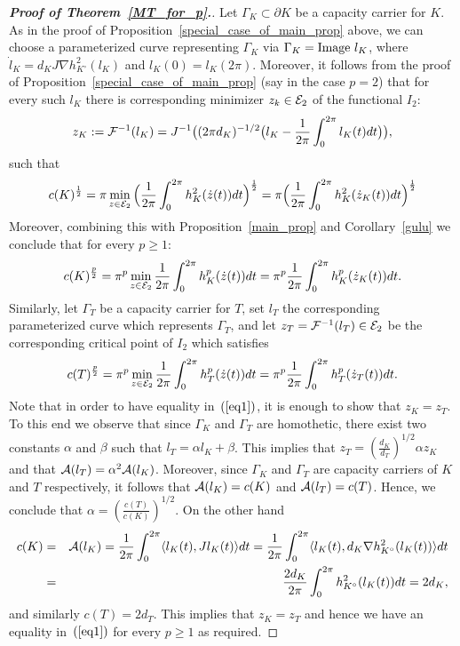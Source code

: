 \documentclass[12pt]{article}
\begin{document}
\begin{proof}[{\bf Proof of Theorem~\ref{MT_for_p}.}]
Let $\Gamma_K \subset
\partial K$ be a capacity carrier for $K$.
As in the proof of Proposition~\ref{special_case_of_main_prop}
above, we can choose a parameterized curve representing $\Gamma_K$
via $\Gamma_K = {\rm Image} \ l_K$, where $ {\dot {l}_K} = d_K J
\nabla h_{K^{\circ}}^2(l_K)$ and $l_K(0) = l_K(2 \pi)$. Moreover, it
follows from the proof of
Proposition~\ref{special_case_of_main_prop} (say in the case $p=2$)
that for every such $l_K$ there is corresponding minimizer $z_k \in
{\cal E}_2$ of the functional $I_2$:
$$z_K
:= {\cal F}^{-1}(l_K) = J^{-1} \bigl ((2 \pi d_K)^{-1/2} \bigl (l_K
- {\frac 1 {2\pi}} \int_0^{2\pi} l_K(t)dt \bigr ) \bigr ),$$ such
that $$ c(K)^{\frac 1 2} = \pi \min_{z \in {\cal E}_2} \Big ( {\frac
1 {2\pi}}\int_0^{2\pi} h_{K}^2(\dot z(t))dt \Big )^{\frac 1 2} = \pi
\Big( {\frac 1 {2\pi}} \int_0^{2 \pi} h_{K}^2(\dot z_K(t))dt \Big
)^{\frac 1 2}$$ Moreover, combining this with
Proposition~\ref{main_prop} and Corollary~\ref{gulu} we conclude
that for every $p\geq1$:
 $$ c(K)^{\frac p 2} = \pi^p \min_{z \in {\cal E}_2}
 {\frac 1 {2\pi}}\int_0^{2\pi} h_{K}^p(\dot z(t))dt  = \pi^p
 {\frac 1 {2\pi}} \int_0^{2 \pi} h_{K}^p(\dot z_K(t))dt.$$
Similarly, let $\Gamma_T$ be a capacity carrier for $T$, set $l_T$
the corresponding parameterized curve which represents $\Gamma_T$,
and let $z_T = {\cal F}^{-1}(l_T) \in {\cal E}_2 $ be the
corresponding critical point of $I_2$ which satisfies
$$ c(T)^{\frac p 2} = \pi^p \min_{z \in {\cal E}_2}
{\frac 1 {2\pi}}\int_0^{2\pi} h_{T}^p(\dot z(t))dt  = \pi^p
 {\frac 1 {2\pi}} \int_0^{2 \pi} h_{T}^p(\dot z_T(t))dt.$$
Note that in order to have equality in~$(\ref{eq1})$, it is enough
to show that $z_K = z_T$. To this end we observe that since
$\Gamma_K$ and $\Gamma_T$ are homothetic, there exist two constants
${\alpha}$ and $\beta$ such that $l_T = \alpha l_K + \beta$. This
implies that $z_T = ({\frac {d_K} {d_T}})^{1/2} \alpha z_K$ and that
${\cal A}(l_T) = \alpha^2 {\cal A}(l_K)$.
 Moreover, since $\Gamma_K$ and $\Gamma_T$ are capacity carriers
of $K$ and $T$ respectively, it follows that ${\cal A}(l_K) = c(K)$
and ${\cal A}(l_T) = c(T)$. Hence, we conclude that $\alpha = (
{\frac {c(T)} {c(K)}})^{1/2}$. On the other hand
\begin{eqnarray*} c(K) & = &{\cal A}(l_K) = {\frac 1 {2\pi}}
\int_0^{2\pi} \langle l_K(t), J l_K(t) \rangle dt = {\frac 1 {2\pi}}
\int_0^{2\pi} \langle l_K(t), d_K \nabla h_{K^{\circ}}^2(l_K(t))
\rangle dt \\ & = & {\frac {2 d_K} {2\pi}} \int_0^{2\pi}
h_{K^{\circ}}^2(l_K(t)) dt = 2 d_K,
\end{eqnarray*} and similarly $c(T) = 2 d_T$. This implies that
$z_K = z_T$ and hence we have an equality in~$(\ref{eq1})$ for every
$p \geq 1$ as required.


\end{proof}
\end{document}
